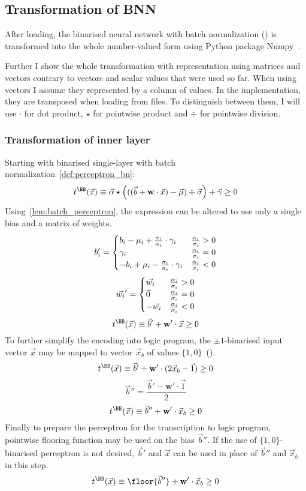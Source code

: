 \subsection{Transformation of BNN}

After loading, the binarised neural network with batch normalization
() is transformed into the whole number-valued
form using Python package Numpy~\cite{harris2020array}.

Further I show the whole transformation with representation using matrices and vectors
contrary to vectors and scalar values that were used so far.
When using vectors I assume they represented by a column of values.
In the implementation, they are transposed when loading from files.
To distinguish between them, I will use $\cdot$ for dot product,
$\star$ for pointwise product and $\div$ for pointwise division.

\subsubsection{Transformation of inner layer}

Starting with binarised single-layer with batch normalization~\cref{def:perceptron_bn}:
\[t^{\BB}(\vec x) \equiv \vec\alpha \star \left({((\vec b + \mathbf{w} \cdot \vec x) - \vec\mu) \div \vec\sigma}\right) + \vec\gamma \geq 0\]
Using~\cref{lem:batch_perceptron}, the expression can be altered to use only a single
bias and a matrix of weights.
\[b_i' = \begin{cases}
	b_i - \mu_i + {\sigma_i\over \alpha_i}\cdot \gamma_i & {\alpha_i \over \sigma_i} > 0\\
	\gamma_i & {\alpha_i\over \sigma_i} = 0\\
	-b_i + \mu_i - {\sigma_i\over \alpha_i}\cdot \gamma_i & {\alpha_i \over \sigma_i} < 0\\
\end{cases}\]
\[\vec{w_i}' = \begin{cases}
	\vec{w_i} & {\alpha_i \over \sigma_i} > 0\\
	\vec{0} & {\alpha_i\over \sigma_i} = 0\\
	-\vec{w_i} & {\alpha_i \over \sigma_i} < 0\\
\end{cases}\]
\[t^\BB(\vec x) \equiv \vec b' + \mathbf{w}'\cdot \vec x \geq 0\]
To further simplify the encoding into logic program, the $\pm 1$-binarised
input vector $\vec x$ may be mapped to vector $\vec x_b$
of values $\{1, 0\}$~().
\[t^\BB(\vec x) \equiv \vec b' + \mathbf{w}'\cdot (2\vec x_b - \vec 1) \geq 0\]
\[\vec b'' = \frac{\vec b' - \mathbf{w}'\cdot \vec 1}{2}\]
\[t^\BB(\vec x) \equiv \vec b'' + \mathbf{w}'\cdot \vec x_b \geq 0\]
Finally to prepare the perceptron for the transcription to logic program,
pointwise flooring function may be used on the bias $\vec b''$.
If the use of $\{1, 0\}$-binarised perceptron is not desired, $\vec b'$ and $\vec x$
can be used in place of $\vec b''$ and $\vec x_b$ in this step.
\[t^\BB(\vec x) \equiv \floor{\vec b''} + \mathbf{w}'\cdot \vec x_b \geq 0\]

